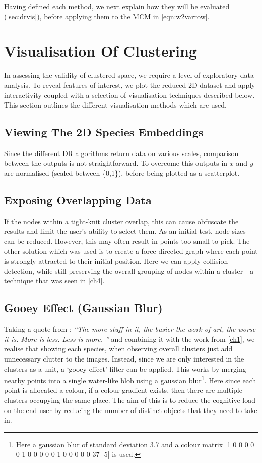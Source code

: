 Having defined each method, we next explain how they will be evaluated (\autoref{sec:drvis}), before applying them to the MCM in \autoref{eqn:w2varrow}.




\section{Visualisation Of Clustering}\label{sec:drvis}

In assessing the validity of clustered space, we require a level of exploratory data analysis. To reveal features of interest, we plot the reduced 2D dataset and apply interactivity coupled with a selection of visualisation techniques described below. This section outlines the different visualisation methods which are used.

\subsection{Viewing The 2D Species Embeddings}
Since the different DR algorithms return data on various scales, comparison between the outputs is not straightforward. To overcome this outputs in $x$ and $y$ are normalised (scaled between \{0,1\}), before being plotted as a scatterplot.


\subsection{Exposing Overlapping Data}
If the nodes within a tight-knit cluster overlap, this can cause obfuscate the results and limit the user's ability to select them. As an initial test, node sizes can be reduced. However, this may often result in points too small to pick. The other solution which was used is to create a force-directed graph where each point is strongly attracted to their initial position. Here we can apply collision detection, while still preserving the overall grouping of nodes within a cluster - a technique that was seen in \autoref{ch4}.


\subsection{Gooey Effect (Gaussian Blur)}
Taking a quote from \cite{lessmore}:
\emph{``The more stuff in it, the busier the work of art, the worse it is. More is less. Less is more. %
''} and combining it with the work from \autoref{ch1}, we realise that showing each species, when observing overall clusters just add unnecessary clutter to the images. Instead, since we are only interested in the clusters as a unit, a `gooey effect' filter can be applied. This works by merging nearby points into a single water-like blob using a gaussian blur\footnote{Here a gaussian blur of standard deviation 3.7 and a colour matrix [1 0 0 0 0  0 1 0 0 0  0 0 1 0 0  0 0 0 37 -5] is used.}. Here since each point is allocated a colour, if a colour gradient exists, then there are multiple clusters occupying the same place. The aim of this is to reduce the cognitive load on the end-user by reducing the number of distinct objects that they need to take in.



